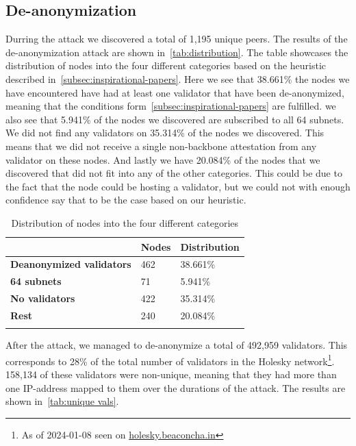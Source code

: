 \subsection{De-anonymization}\label{subsec:de-anonymization}
Durring the attack we discovered a total of 1,195 unique peers.
The results of the de-anonymization attack are shown in~\autoref{tab:distribution}.
The table showcases the distribution of nodes into the four different categories based on the heuristic described in~\autoref{subsec:inspirational-papers}.
Here we see that 38.661\% the nodes we have encountered have had at least one validator that have been de-anonymized, meaning that the conditions form~\autoref{subsec:inspirational-papers} are fulfilled.
we also see that 5.941\% of the nodes we discovered are subscribed to all 64 subnets.
We did not find any validators on 35.314\% of the nodes we discovered.
This means that we did not receive a single non-backbone attestation from any validator on these nodes.
And lastly we have 20.084\% of the nodes that we discovered that did not fit into any of the other categories.
This could be due to the fact that the node could be hosting a validator, but we could not with enough confidence say that to be the case based on our heuristic.


\begin{table}[]
    \centering
    \begin{tabular}{lll}
        \hline
        & \textbf{Nodes} & \textbf{Distribution} \\ \hline
        \textbf{Deanonymized validators} & 462            & 38.661\%                 \\
        \textbf{64 subnets}              & 71             & 5.941\%                  \\
        \textbf{No validators}           & 422              & 35.314\%               \\
        \textbf{Rest}                    & 240            & 20.084\%                 \\ \hline
        \\
    \end{tabular}
    \caption{Distribution of nodes into the four different categories}
    \label{tab:distribution}
\end{table}


After the attack, we managed to de-anonymize a total of 492,959 validators.
This corresponds to 28\% of the total number of validators in the Holesky network\footnote{As of 2024-01-08 seen on \href{https://holesky.beaconcha.in/}{holesky.beaconcha.in}}.
158,134 of these validators were non-unique, meaning that they had more than one IP-address mapped to them over the durations of the attack.
The results are shown in~\autoref{tab:unique vals}.


